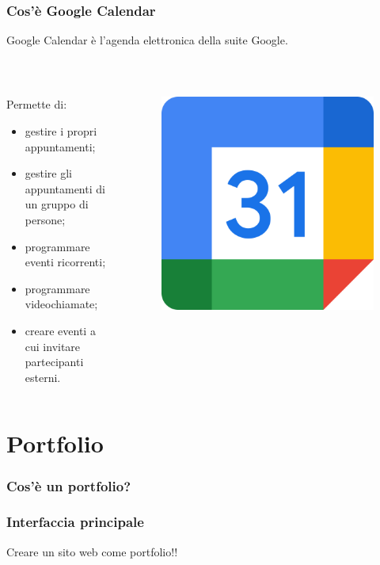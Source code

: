 \documentclass[handout]{beamer}
\begin{document}
\begin{frame}
\frametitle{Cos'è Google Calendar}
Google Calendar è l'\alert{agenda elettronica} della suite Google.\pause

~

\begin{columns}
\begin{column}{.7\textwidth}
  Permette di:
  \begin{itemize}
    \item gestire i propri appuntamenti;\pause
    \item gestire gli appuntamenti di un gruppo di persone;\pause
    \item programmare eventi ricorrenti;\pause
    \item programmare videochiamate;\pause
    \item creare eventi a cui invitare partecipanti esterni.
  \end{itemize}  
\end{column}
\begin{column}{.2\textwidth}
  \begin{figure}
    \includegraphics[width=\columnwidth]{img/calendarlogo.png}
  \end{figure}
\end{column}
\end{columns}
\end{frame}



\section{Portfolio}

\begin{frame}
\frametitle{Cos'è un portfolio?}

  

\end{frame}


\begin{frame}
\frametitle{Interfaccia principale}
Creare un sito web come portfolio!!
\end{frame}
\end{document}
